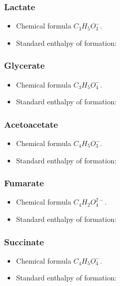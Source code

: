 \documentclass{article}
\begin{document}
\subsubsection{Lactate}
\begin{itemize}
    \item Chemical formula $C_3H_5O_3^-$.
    \item Standard enthalpy of formation:
\end{itemize}

\subsubsection{Glycerate}
\begin{itemize}
    \item Chemical formula $C_3H_5O_4^-$.
    \item Standard enthalpy of formation:
\end{itemize}

\subsubsection{Acetoacetate}
\begin{itemize}
    \item Chemical formula $C_4H_5O_3^-$.
    \item Standard enthalpy of formation:
\end{itemize}

\subsubsection{Fumarate}
\begin{itemize}
    \item Chemical formula $C_4H_2O_4^{2-}$.
    \item Standard enthalpy of formation:
\end{itemize}

\subsubsection{Succinate}
\begin{itemize}
    \item Chemical formula $C_4H_5O_4^-$.
    \item Standard enthalpy of formation:
\end{itemize}
\end{document}
